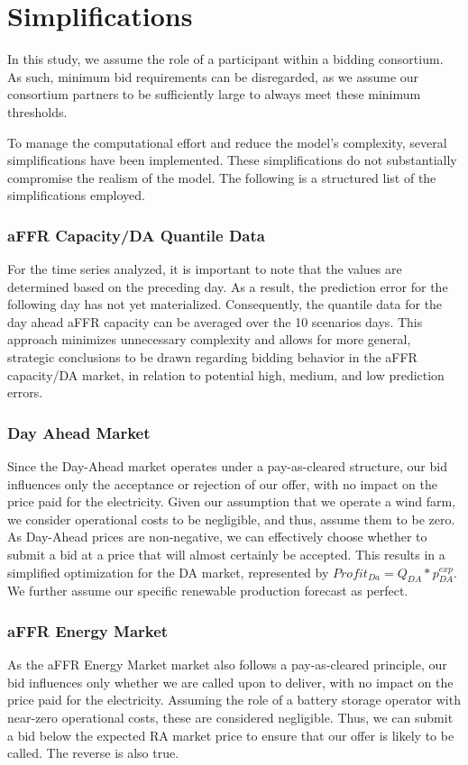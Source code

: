 \section{Simplifications}
\label{chap:Simplifications}
In this study, we assume the role of a participant within a bidding consortium.
As such, minimum bid requirements can be disregarded,
as we assume our consortium partners to be sufficiently large to always meet these minimum thresholds.

To manage the computational effort and reduce the model's complexity, several simplifications have been implemented.
These simplifications do not substantially compromise the realism of the model.
The following is a structured list of the simplifications employed.

\subsubsection{aFFR Capacity/DA Quantile Data}
For the time series analyzed, it is important to note that the values are determined based on the preceding day.
As a result, the prediction error for the following day has not yet materialized.
Consequently, the quantile data for the day ahead aFFR capacity can be averaged over the 10 scenarios days.
This approach minimizes unnecessary complexity and allows for more general,
strategic conclusions to be drawn regarding bidding behavior in the aFFR capacity/DA market,
in relation to potential high, medium, and low prediction errors.

\subsubsection{Day Ahead Market}
Since the Day-Ahead market operates under a pay-as-cleared structure, our bid influences only the acceptance or rejection of our offer,
with no impact on the price paid for the electricity.
Given our assumption that we operate a wind farm, we consider operational costs to be negligible, and thus, assume them to be zero.
As Day-Ahead prices are non-negative, we can effectively choose whether to submit a bid at a price that will almost certainly be accepted.
This results in a simplified optimization for the DA market, represented by $Profit_{Da} = Q_{DA} * p^{exp}_{DA}$.
We further assume our specific renewable production forecast as perfect.

\subsubsection{aFFR Energy Market}
As the aFFR Energy Market market also follows a pay-as-cleared principle, our bid influences only whether we are called upon to deliver, with no impact on the price paid for the electricity.
Assuming the role of a battery storage operator with near-zero operational costs, these are considered negligible.
Thus, we can submit a bid below the expected RA market price to ensure that our offer is likely to be called.
The reverse is also true.

